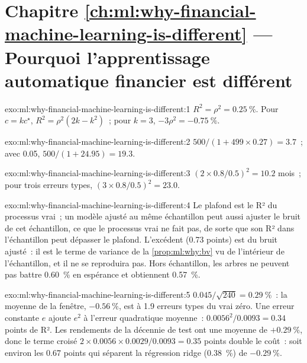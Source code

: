 \section*{Chapitre \ref{ch:ml:why-financial-machine-learning-is-different} --- Pourquoi l'apprentissage automatique financier est différent}

\begin{solution}{exo:ml:why-financial-machine-learning-is-different:1}
$R^2 = \rho^2 = 0.25~\%$. Pour $c = kc^\star$, $R^2 = \rho^2(2k - k^2)$~; pour $k = 3$, $-3\rho^2 = -0.75~\%$.
\end{solution}

\begin{solution}{exo:ml:why-financial-machine-learning-is-different:2}
$500/(1 + 499\times0.27) = 3.7$~; avec 0.05, $500/(1 + 24.95) = 19.3$.
\end{solution}

\begin{solution}{exo:ml:why-financial-machine-learning-is-different:3}
$(2\times0.8/0.5)^2 = 10.2$ mois~; pour trois erreurs types, $(3\times0.8/0.5)^2 = 23.0$.
\end{solution}

\begin{solution}{exo:ml:why-financial-machine-learning-is-different:4}
Le plafond est le R² du processus vrai~; un modèle ajusté au même échantillon peut aussi ajuster le bruit de cet échantillon, ce que
le processus vrai ne fait pas, de sorte que son R² dans l'échantillon peut dépasser le plafond. L'excédent (0.73 points) est du bruit ajusté~: il est
le terme de variance de la \cref{prop:ml:why:bv} vu de l'intérieur de l'échantillon, et il ne se reproduira pas. Hors échantillon, les arbres
ne peuvent pas battre 0.60~\% en espérance et obtiennent 0.57~\%.
\end{solution}

\begin{solution}{exo:ml:why-financial-machine-learning-is-different:5}
$0.045/\sqrt{240} = 0.29~\%$~: la moyenne de la fenêtre, $-0.56~\%$, est à 1.9 erreurs types du vrai zéro. Une erreur constante $e$ ajoute
$e^2$ à l'erreur quadratique moyenne~: $0.0056^2/0.0093 = 0.34$ points de R². Les rendements de la décennie de test ont une moyenne de
$+0.29~\%$, donc le terme croisé $2\times0.0056\times0.0029/0.0093 = 0.35$ points double le coût~: soit environ les 0.67 points qui séparent
la régression ridge (0.38~\%) de $-0.29~\%$.
\end{solution}

